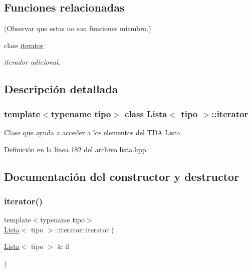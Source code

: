 \subsection*{Funciones relacionadas}
(Observar que estas no son funciones miembro.) \begin{DoxyCompactItemize}
\item 
\mbox{\label{classLista_1_1iterator_a67171474c4da6cc8efe0c7fafefd2b2d}} 
class \hyperlink{classLista_1_1iterator_a67171474c4da6cc8efe0c7fafefd2b2d}{iterator}
\begin{DoxyCompactList}\small\item\em iterador adicional. \end{DoxyCompactList}\end{DoxyCompactItemize}


\subsection{Descripción detallada}
\subsubsection*{template$<$typename tipo$>$\newline
class Lista$<$ tipo $>$\+::iterator}

Clase que ayuda a acceder a los elementos del T\+DA \hyperlink{classLista}{Lista}. 

Definición en la línea 182 del archivo lista.\+hpp.



\subsection{Documentación del constructor y destructor}
\mbox{\label{classLista_1_1iterator_a1535d6055cf70a60518be63c0f62cc1d}} 
\subsubsection{\texorpdfstring{iterator()}{iterator()}\hspace{0.1cm}{\footnotesize\ttfamily [1/2]}}
{\footnotesize\ttfamily template$<$typename tipo$>$ \\
\hyperlink{classLista}{Lista}$<$ tipo $>$\+::iterator\+::iterator (\begin{DoxyParamCaption}\item[{\hyperlink{classLista}{Lista}$<$ tipo $>$ \&}]{il }\end{DoxyParamCaption})\hspace{0.3cm}{\ttfamily [inline]}}



